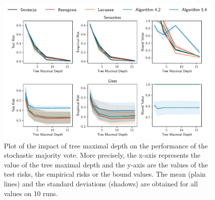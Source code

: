 \begin{noaddcontents}
\begin{figure}
    \centering
    \includegraphics[width=\textwidth]{chapter_5/figures/depth_4.pdf}
    \caption{
    Plot of the impact of tree maximal depth on the performance of the stochastic majority vote.
    More precisely, the x-axis represents the value of the tree maximal depth and the y-axis are the values of the test risks, the empirical risks or the bound values.
    The mean (plain lines) and the standard deviations (shadows) are obtained for all values on 10 runs.
    }
    \label{ap:mv-sto:fig:depth-4}
\end{figure}


\end{noaddcontents}

